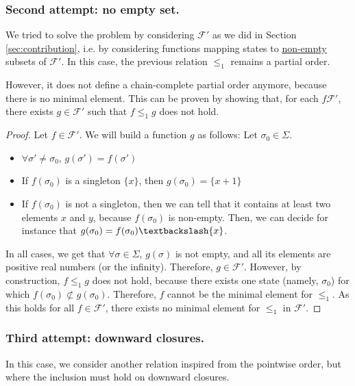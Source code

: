 \documentclass[a4paper,10pt]{llncs}
\begin{document}
\subsubsection{Second attempt: no empty set.}
We tried to solve the problem by considering $\mathcal{F}'$ as we did in Section \ref{sec:contribution}, i.e. by considering functions mapping states to \underline{non-empty} subsets of $\mathcal{F}'$. In this case, the previous relation $\leq_1$ remains a partial order. \bigskip

However, it does not define a chain-complete partial order anymore, because there is no minimal element. This can be proven by showing that, for each $f \mathcal{F}'$, there exists $g \in \mathcal{F}'$ such that $f \leq_1 g$ does not hold.\bigskip

\begin{proof}
Let $f \in \mathcal{F}'$. We will build a function $g$ as follows:
Let $\sigma_0 \in \Sigma$.
\begin{itemize}
\item $\forall \sigma' \neq \sigma_0$, $g(\sigma') = f(\sigma')$
\item If $f(\sigma_0)$ is a singleton $\{x\}$, then $g(\sigma_0) = \{x + 1\}$
\item If $f(\sigma_0)$ is not a singleton, then we can tell that it contains at least two elements $x$ and $y$, because $f(\sigma_0)$ is non-empty. Then, we can decide for instance that $g(\sigma_0) = f(\sigma_0)\textbackslash\{x\}$.
\end{itemize}
In all cases, we get that $\forall \sigma \in \Sigma$, $g(\sigma)$ is not empty, and all its elements are positive real numbers (or the infinity). Therefore, $g \in \mathcal{F}'$. However, by construction, $f \leq_1 g$ does not hold, because there exists one state (namely, $\sigma_0$) for which $f(\sigma_0) \not\subset g(\sigma_0)$.\newline
Therefore, $f$ cannot be the minimal element for $\leq_1$. As this holds for all $f \in \mathcal{F}'$, there exists no minimal element for $\leq_1$ in $\mathcal{F}'$.
\end{proof}

\subsubsection{Third attempt: downward closures.} In this case, we consider another relation inspired from the pointwise order, but where the inclusion must hold on downward closures.
\end{document}
